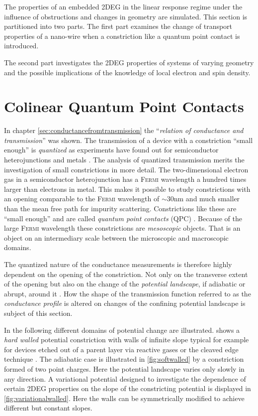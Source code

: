 The properties of an embedded 2DEG in the linear response regime under the influence of obstructions and changes in geometry are simulated. This section is partitioned into two parts. The first part examines the change of transport properties of a nano-wire when a constriction like a quantum point contact is introduced.\par
The second part investigates the 2DEG properties of systems of varying geometry and the possible implications of the knowledge of local electron and spin density.\par
\section{Colinear Quantum Point Contacts}

In chapter \ref{sec:conductancefromtransmission} the ``\emph{relation of conductance and transmission}'' \cite{landauer1996} was shown. The transmission of a device with a constriction ``small enough'' is \emph{quantized} as experiments have found out for semiconductor heterojunctions \cite{vanHoutenBeenakker2005} and metals \cite{PhysRevB.36.1284}. The analysis of quantized transmission merits the investigation of small constrictions in more detail.
The two-dimensional electron gas in a semiconductor heterojunction has a \textsc{Fermi} wavelength a hundred times larger than electrons in metal. This makes it possible to study constrictions with an opening comparable to the \textsc{Fermi} wavelength of $\sim 30\text{nm}$ and much smaller than the mean free path for impurity scattering. Constrictions like these are ``small enough'' and are called \emph{quantum point contacts} (QPC) \cite{vanHoutenBeenakker2005}. Because of the large \textsc{Fermi} wavelength these constrictions are \emph{mesoscopic} objects. That is an object on an intermediary scale between the microscopic and macroscopic domains.\par
The quantized nature of the conductance measurements is therefore highly dependent on the opening of the constriction. Not only on the transverse extent of the opening but also on the change of the \emph{potential landscape}, if adiabatic or abrupt,  around it \cite{PhysRevB.44.8017}. How the shape of the transmission function referred to as the \emph{conductance profile} is altered on changes of the confining potential landscape is subject of this section.\par
In the following different domains of potential change are illustrated.  shows a \emph{hard walled} potential constriction with walls of infinite slope typical for example for devices etched out of a parent layer via reactive gases or the cleaved edge technique \cite{ApplPhysLett.66.323}. The adiabatic case is illustrated in \cref{fig:softwalled} by a constriction formed of two point charges. Here the potential landscape varies only slowly in any direction. A variational potential designed to investigate the dependence of certain 2DEG properties on the slope of the constricting potential is displayed in \cref{fig:variationalwalled}. Here the walls can be symmetrically modified to achieve different but constant slopes.
